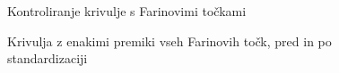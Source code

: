\documentclass[isrm2, tisk]{fmfdelo}
\begin{document}
\begin{figure}[ht!]
        \qquad
        \caption{Kontroliranje krivulje s Farinovimi točkami}
        \label{fig:farinove-tocke}
    \end{figure}

    \begin{figure}[ht!]
        \centering
        \qquad
        \caption{Krivulja z enakimi premiki vseh Farinovih točk, pred in po standardizaciji}
        \label{fig:farinove-tocke-2}
    \end{figure}
\end{document}
